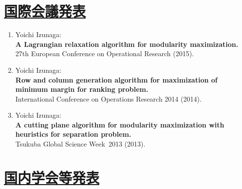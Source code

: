 \documentclass[a4j,uplatex,9pt]{jsarticle}
\begin{document}
\section*{\underline{国際会議発表}}

\begin{enumerate}

\item Yoichi Izunaga:\\
{\bf A Lagrangian relaxation algorithm for modularity maximization.}\\
{27th European Conference on Operational Research} (2015).

\item Yoichi Izunaga:\\
{\bf Row and column generation algorithm for maximization of minimum margin for ranking problem.}\\
{International Conference on Operations Research 2014} (2014).


\item Yoichi Izunaga:\\
{\bf A cutting plane algorithm for modularity maximization with heuristics for separation problem.}\\
Tsukuba Global Science Week~2013 (2013).

\end{enumerate}

\section*{\underline{国内学会等発表}}
\end{document}
